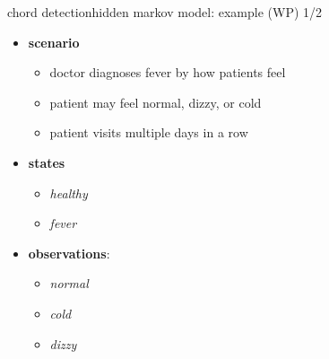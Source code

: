         \begin{frame}{chord detection}{hidden markov model: example (WP) 1/2}
            \begin{itemize}
                \item   \textbf{scenario}
                    \begin{itemize}
                        \item   doctor diagnoses fever by how patients feel
                        \item   patient may feel normal, dizzy, or cold
                        \item   patient visits multiple days in a row 
                    \end{itemize}
            \end{itemize}
            
            \begin{itemize}
                \item	\textbf{states} %
                    \begin{itemize}
                        \item   \textit{healthy}
                        \item   \textit{fever}
                    \end{itemize}
                \item   \textbf{observations}: %
                    \begin{itemize}
                        \item   \textit{normal}
                        \item   \textit{cold}
                        \item   \textit{dizzy}
                    \end{itemize}
            \end{itemize}
        \end{frame}
